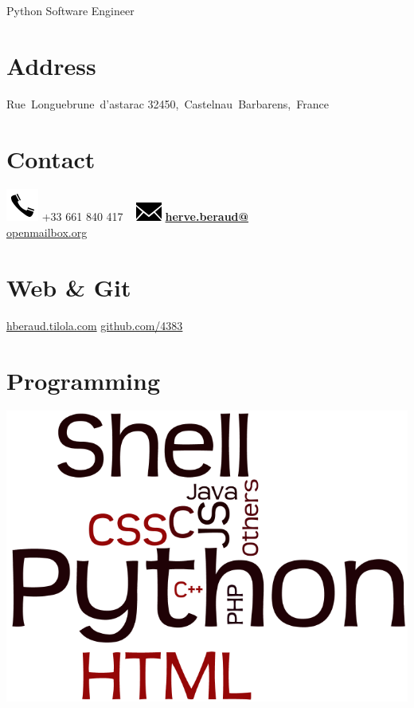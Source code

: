 \documentclass[]{friggeri-cv}
\begin{document}
      {Python Software Engineer}
      

\begin{aside}
  \section{Address}
    Rue~Longuebrune~d'astarac
    32450,~Castelnau~Barbarens,~France
    ~
  \section{Contact}
    \includegraphics[scale=0.50]{img/phone.png}
    +33 661 840 417
    ~
    \includegraphics[scale=0.50]{img/mail.png}
    \href{mailto:herve.beraud@openmailbox.org}{\textbf{herve.beraud@}\\openmailbox.org}
    ~
  \section{Web \& Git}
    \href{http://hberaud.tilola.com}{hberaud.tilola.com}
    \href{https://github.com/4383}{github.com/4383}
    ~
  \section{Programming}
    \includegraphics[scale=0.15]{img/programming.png}
    ~

\end{aside}
\end{document}

